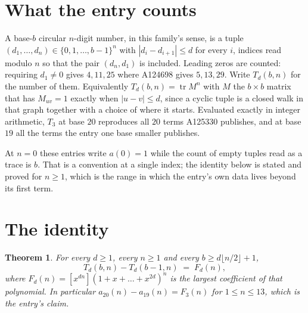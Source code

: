 \documentclass[11pt,a4paper]{article}
\theoremstyle{plain}
\newtheorem{theorem}{Theorem}
\theoremstyle{definition}
\begin{document}
\section{What the entry counts}

A base-$b$ circular $n$-digit number, in this family's sense, is a tuple
$(d_1,\dots,d_n)\in\{0,1,\dots,b-1\}^{n}$ with $|d_i-d_{i+1}|\le d$ for every $i$, indices
read modulo $n$ so that the pair $(d_n,d_1)$ is included. Leading zeros are counted: requiring
$d_1\ne0$ gives $4,11,25$ where A124698 gives $5,13,29$. Write $T_d(b,n)$ for the number of
them. Equivalently $T_d(b,n)=\operatorname{tr}M^{n}$ with $M$ the $b\times b$ matrix that has
$M_{uv}=1$ exactly when $|u-v|\le d$, since a cyclic tuple is a closed walk in that graph
together with a choice of where it starts. Evaluated exactly in integer arithmetic, $T_{3}$
at base $20$ reproduces all $20$ terms A125330 publishes, and at base $19$ all the
terms the entry one base smaller publishes.

At $n=0$ these entries write $a(0)=1$ while the count of empty tuples read as a trace is $b$.
That is a convention at a single index; the identity below is stated and proved for $n\ge1$,
which is the range in which the entry's own data lives beyond its first term.

\section{The identity}

\begin{theorem}
For every $d\ge1$, every $n\ge1$ and every $b\ge d\lfloor n/2\rfloor+1$,
\[
T_d(b,n)-T_d(b-1,n)\;=\;F_d(n),
\]
where $F_d(n)=[x^{dn}](1+x+\dots+x^{2d})^{n}$ is the largest coefficient of that
polynomial. In particular $a_{20}(n)-a_{19}(n)=F_{3}(n)$ for $1\le n\le13$, which
is the entry's claim.
\end{theorem}
\end{document}
